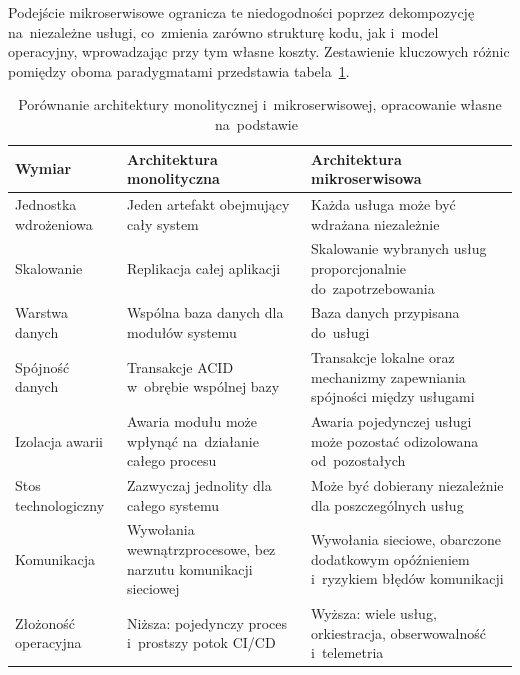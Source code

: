 Podejście mikroserwisowe ogranicza te niedogodności poprzez dekompozycję na~niezależne usługi, co~zmienia zarówno strukturę kodu, jak i~model operacyjny, wprowadzając przy tym własne koszty. Zestawienie kluczowych różnic pomiędzy oboma paradygmatami przedstawia tabela~\ref{tab:MonolitMikroserwisy}.

\begin{table}[htb]
\centering
\footnotesize
\caption{Porównanie architektury monolitycznej i~mikroserwisowej, opracowanie własne na~podstawie~\cite{bib:Newman2021, bib:Richardson2018}}
\label{tab:MonolitMikroserwisy}
\begin{tabular}{|p{3.1cm}|p{5.0cm}|p{5.0cm}|}

\hline

\textbf{Wymiar} & \textbf{Architektura monolityczna} & \textbf{Architektura mikroserwisowa} \\

\hline

Jednostka wdrożeniowa 
& Jeden artefakt obejmujący cały system 
& Każda usługa może być wdrażana niezależnie \\

\hline

Skalowanie 
& Replikacja całej aplikacji 
& Skalowanie wybranych usług proporcjonalnie do~zapotrzebowania \\

\hline

Warstwa danych 
& Wspólna baza danych dla modułów systemu 
& Baza danych przypisana do~usługi \\

\hline

Spójność danych 
& Transakcje ACID w~obrębie wspólnej bazy 
& Transakcje lokalne oraz mechanizmy zapewniania spójności między usługami \\

\hline

Izolacja awarii 
& Awaria modułu może wpłynąć na~działanie całego procesu 
& Awaria pojedynczej usługi może pozostać odizolowana od~pozostałych \\

\hline

Stos technologiczny 
& Zazwyczaj jednolity dla całego systemu 
& Może być dobierany niezależnie dla poszczególnych usług \\

\hline

Komunikacja 
& Wywołania wewnątrzprocesowe, bez narzutu komunikacji sieciowej 
& Wywołania sieciowe, obarczone dodatkowym opóźnieniem i~ryzykiem błędów komunikacji \\

\hline

Złożoność operacyjna 
& Niższa: pojedynczy proces i~prostszy potok CI/CD 
& Wyższa: wiele usług, orkiestracja, obserwowalność i~telemetria \\

\hline

\end{tabular}

\end{table}

